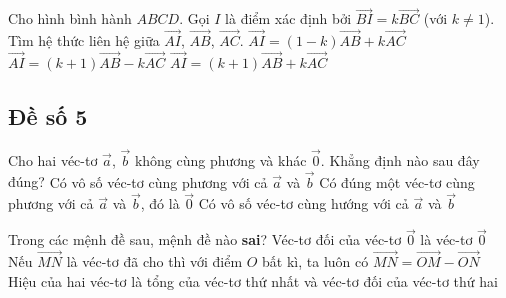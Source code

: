 \begin{ex}%
	Cho hình bình hành $ABCD$. Gọi $I$ là điểm xác định bởi $\vec{BI} = k\vec{BC}$ (với $k \neq 1$). Tìm hệ thức liên hệ giữa $\vec{AI}$, $\vec{AB}$, $\vec{AC}$.
	{\True $\vec{AI} = (1 - k)\vec{AB} + k\vec{AC}$}
	{$\vec{AI} = (k + 1)\vec{AB} - k\vec{AC}$}
	{$\vec{AI} = (k + 1)\vec{AB} + k\vec{AC}$}
\end{ex}



\subsection*{Đề số 5}
\begin{ex}%
	Cho hai véc-tơ $\vec{a}$, $ \vec{b}$ không cùng phương và khác $\vec{0}$. Khẳng định nào sau đây đúng?
	{Có vô số véc-tơ cùng phương với cả $ \vec{a}$ và $ \vec{b}$}
	{\True Có đúng một véc-tơ cùng phương với cả $ \vec{a}$ và $ \vec{b}$, đó là $\vec{0}$}
	{{Có vô số véc-tơ cùng hướng với cả $ \vec{a}$ và $ \vec{b}$}}
\end{ex}

\begin{ex}%
	Trong các mệnh đề sau, mệnh đề nào \textbf{sai}?
	{Véc-tơ đối của véc-tơ $\vec{0}$ là véc-tơ $ \vec{0}$ }
	{\True Nếu $ \vec{MN}$ là véc-tơ đã cho thì với điểm $O$ bất kì, ta luôn có $ \vec{MN}= \vec{OM}- \vec{ON}$}
	{Hiệu của hai véc-tơ là tổng của véc-tơ thứ nhất và véc-tơ đối của véc-tơ thứ hai}
\end{ex}

